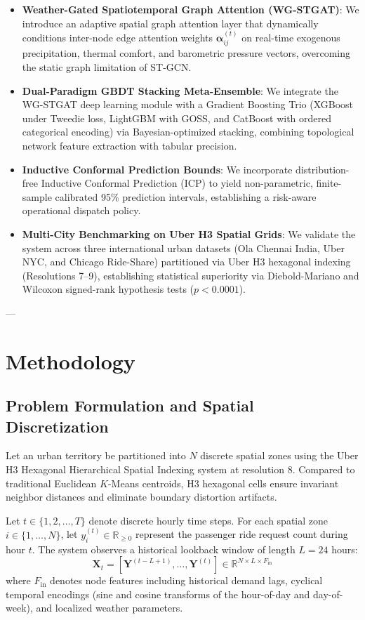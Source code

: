 \documentclass[10pt,journal,compsoc]{IEEEtran}
\begin{document}
\begin{itemize}
    \item \textbf{Weather-Gated Spatiotemporal Graph Attention (WG-STGAT)}: We introduce an adaptive spatial graph attention layer that dynamically conditions inter-node edge attention weights $\mathbf{\alpha}_{ij}^{(t)}$ on real-time exogenous precipitation, thermal comfort, and barometric pressure vectors, overcoming the static graph limitation of ST-GCN.
    \item \textbf{Dual-Paradigm GBDT Stacking Meta-Ensemble}: We integrate the WG-STGAT deep learning module with a Gradient Boosting Trio (XGBoost under Tweedie loss, LightGBM with GOSS, and CatBoost with ordered categorical encoding) via Bayesian-optimized stacking, combining topological network feature extraction with tabular precision.
    \item \textbf{Inductive Conformal Prediction Bounds}: We incorporate distribution-free Inductive Conformal Prediction (ICP) to yield non-parametric, finite-sample calibrated 95\% prediction intervals, establishing a risk-aware operational dispatch policy.
    \item \textbf{Multi-City Benchmarking on Uber H3 Spatial Grids}: We validate the system across three international urban datasets (Ola Chennai India, Uber NYC, and Chicago Ride-Share) partitioned via Uber H3 hexagonal indexing (Resolutions 7--9), establishing statistical superiority via Diebold-Mariano and Wilcoxon signed-rank hypothesis tests ($p < 0.0001$).
\end{itemize}

---

\section{Methodology}

\subsection{Problem Formulation and Spatial Discretization}
Let an urban territory be partitioned into $N$ discrete spatial zones using the Uber H3 Hexagonal Hierarchical Spatial Indexing system at resolution 8. Compared to traditional Euclidean $K$-Means centroids, H3 hexagonal cells ensure invariant neighbor distances and eliminate boundary distortion artifacts.

Let $t \in \{1, 2, \dots, T\}$ denote discrete hourly time steps. For each spatial zone $i \in \{1, \dots, N\}$, let $y_i^{(t)} \in \mathbb{R}_{\ge 0}$ represent the passenger ride request count during hour $t$. The system observes a historical lookback window of length $L = 24$ hours:
\begin{equation}
\mathbf{X}_t = \left[ \mathbf{Y}^{(t-L+1)}, \dots, \mathbf{Y}^{(t)} \right] \in \mathbb{R}^{N \times L \times F_{\text{in}}}
\end{equation}
where $F_{\text{in}}$ denotes node features including historical demand lags, cyclical temporal encodings (sine and cosine transforms of the hour-of-day and day-of-week), and localized weather parameters. 
\end{document}
